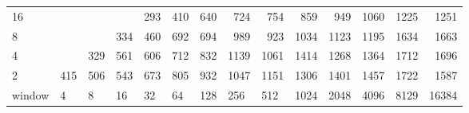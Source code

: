 \begin{table}[h]
{\begin{tabular}{lrrrrrrrrrrrrr}
			\multicolumn{1}{|l|}{16} &  &  &  & \cellcolor[HTML]{99E600}293 & \cellcolor[HTML]{99E600}410 & \cellcolor[HTML]{E69900}640 & \cellcolor[HTML]{E69900}724 & \cellcolor[HTML]{E69900}754 & \cellcolor[HTML]{E60000}859 & \cellcolor[HTML]{E60000}949 & \cellcolor[HTML]{E60000}1060 & \cellcolor[HTML]{9900E6}1225 & \cellcolor[HTML]{9900E6}1251 \\ \cline{1-1}
			\multicolumn{1}{|l|}{8} &  &  & \cellcolor[HTML]{99E600}334 & \cellcolor[HTML]{99E600}460 & \cellcolor[HTML]{E69900}692 & \cellcolor[HTML]{E69900}694 & \cellcolor[HTML]{E60000}989 & \cellcolor[HTML]{E60000}923 & \cellcolor[HTML]{E60000}1034 & \cellcolor[HTML]{9900E6}1123 & \cellcolor[HTML]{9900E6}1195 & \cellcolor[HTML]{4C00E6}1634 & \cellcolor[HTML]{4C00E6}1663 \\ \cline{1-1}
			\multicolumn{1}{|l|}{4} &  & \cellcolor[HTML]{99E600}329 & \cellcolor[HTML]{E69900}561 & \cellcolor[HTML]{E69900}606 & \cellcolor[HTML]{E69900}712 & \cellcolor[HTML]{E60000}832 & \cellcolor[HTML]{9900E6}1139 & \cellcolor[HTML]{9900E6}1061 & \cellcolor[HTML]{9900E6}1414 & \cellcolor[HTML]{9900E6}1268 & \cellcolor[HTML]{4C00E6}1364 & \cellcolor[HTML]{4C00E6}1712 & \cellcolor[HTML]{4C00E6}1696 \\ \cline{1-1}
			\multicolumn{1}{|l|}{2} & \cellcolor[HTML]{99E600}415 & \cellcolor[HTML]{99E600}506 & \cellcolor[HTML]{E69900}543 & \cellcolor[HTML]{E69900}673 & \cellcolor[HTML]{E60000}805 & \cellcolor[HTML]{E60000}932 & \cellcolor[HTML]{E60000}1047 & \cellcolor[HTML]{9900E6}1151 & \cellcolor[HTML]{9900E6}1306 & \cellcolor[HTML]{9900E6}1401 & \cellcolor[HTML]{4C00E6}1457 & \cellcolor[HTML]{4C00E6}1722 & \cellcolor[HTML]{4C00E6}1587 \\ \hline
			\multicolumn{1}{l|}{window} & \multicolumn{1}{l|}{4} & \multicolumn{1}{l|}{8} & \multicolumn{1}{l|}{16} & \multicolumn{1}{l|}{32} & \multicolumn{1}{l|}{64} & \multicolumn{1}{l|}{128} & \multicolumn{1}{l|}{256} & \multicolumn{1}{l|}{512} & \multicolumn{1}{l|}{1024} & \multicolumn{1}{l|}{2048} & \multicolumn{1}{l|}{4096} & \multicolumn{1}{l|}{8129} & \multicolumn{1}{l|}{16384} \\ \cline{2-14} 
		\end{tabular}
	}
\end{table}


